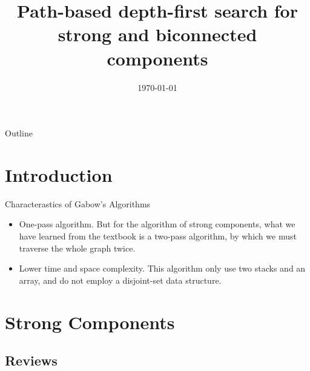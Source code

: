 \documentclass{beamer}
\title[Path-based DFS for SCC and BCC] %
{Path-based depth-first search for strong and biconnected components}
\author[Harold N. Gabow] %
{\textbf{Author of the paper: Harold N. Gabow}\newline\newline
 {Reported by: T.T. Liu \and D.P. Xu \and B.Y. Chen } }
\date{\scriptsize{\today} }
\begin{document}
\begin{frame}
  \titlepage
\end{frame}

\begin{frame}{Outline}
  \tableofcontents
\end{frame}





\section{Introduction}

\begin{frame}{Characterastics of Gabow's Algorithms}
	\begin{itemize}
		\item
		\alert{One-pass algorithm.} But for the algorithm of strong components, what we have learned from
		the textbook is a two-pass algorithm, by which we must traverse the whole graph twice. 
		\item
		\alert{Lower time and space complexity.} This algorithm only use two stacks and an array, and do not
		employ a disjoint-set data structure.
	\end{itemize}
\end{frame}


\section{Strong Components}

\subsection{Reviews}
\end{document}

